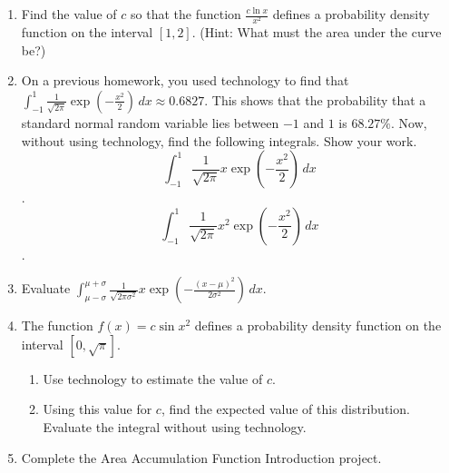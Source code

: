 \documentclass{article}
\begin{document}
\begin{itemize}
\begin{enumerate}
                    \item Find the value of $c$ so that the function 
                    $\displaystyle \frac{c\ln{x}}{x^2}$ defines a probability density function on the interval $[1,2]$. (Hint: What must the area under the curve be?)
                    
                    \item On a previous homework, you used technology to find that $\displaystyle \int_{-1}^{1} \frac{1}{\sqrt{2\pi}} \exp\left(-\frac{x^2}{2}\right)\,dx \approx 0.6827$. This shows that the probability that a standard normal random variable lies between $-1$ and $1$ is $68.27\%$. Now, without using technology, find the following integrals. Show your work.
                    $$\displaystyle \int_{-1}^{1} \frac{1}{\sqrt{2\pi}}x \exp\left(-\frac{x^2}{2}\right)\,dx$$.
                    $$\displaystyle \int_{-1}^{1} \frac{1}{\sqrt{2\pi}}x^2 \exp\left(-\frac{x^2}{2}\right)\,dx$$.
                    \item Evaluate $\displaystyle \int_{\mu-\sigma}^{\mu+\sigma} \frac{1}{\sqrt{2\pi \sigma^2}}x \exp\left(-\frac{(x-\mu)^2}{2\sigma^2}\right)\,dx$.
                    \item The function $f(x) = c\sin{x^2}$ defines a probability density function on the interval $[0, \sqrt{\pi}]$.
                    \begin{enumerate}
                        \item Use technology to estimate the value of $c$.
                        \item Using this value for $c$, find the expected value of this distribution. Evaluate the integral without using technology.
                    \end{enumerate}
                    \item Complete the Area Accumulation Function Introduction project.

                \end{enumerate}
        \end{itemize}
\end{document}

